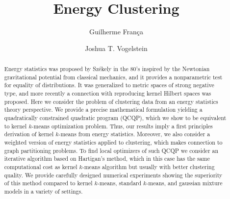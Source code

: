 \documentclass[aps,preprint,nofootinbib,floatfix]{revtex4-1}
\begin{document}
\title{Energy Clustering}

\author{Guilherme Fran\c ca}

\author{Joshua T. Vogelstein}



\begin{abstract}
Energy statistics 
was proposed by 
Sz\' ekely in the 80's
inspired by the Newtonian gravitational potential from classical mechanics,
and it provides a nonparametric test for equality of distributions.
It was generalized to 
metric spaces of strong negative type,
and more recently a connection with reproducing kernel Hilbert spaces 
was proposed.
Here we consider the problem of clustering data from
an energy statistics theory perspective.
We provide a precise mathematical formulation yielding
a quadratically constrained quadratic program (QCQP), which we show
to be equivalent
to kernel $k$-means optimization problem.
Thus, our results imply a first principles derivation of 
kernel $k$-means from energy statistics.
Moreover, we also consider a weighted version of energy statistics 
applied to clustering, which makes connection to 
graph partitioning problems.
To find local optimizers of such QCQP we consider an iterative
algorithm based on Hartigan's method, which in this case
has the same computational cost 
as kernel $k$-means algorithm but usually with better clustering
quality. We provide carefully designed numerical experiments
showing the superiority of this method compared to
kernel $k$-means, standard $k$-means, and gaussian mixture models in a variety of settings.
\end{abstract}
\end{document}
